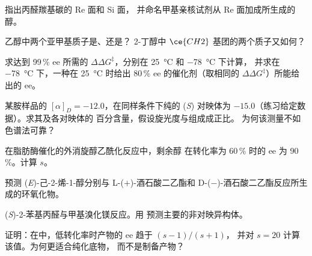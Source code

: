 \begin{exercise}[$\star$]\label{exo:b3:asymmetric-synthesis:3}
指出丙醛羰基碳的 Re 面和 Si 面，
并命名甲基亲核试剂从 Re 面加成所生成的醇。
\end{exercise}

\begin{exercise}[$\star$]\label{exo:b3:asymmetric-synthesis:4}
乙醇中两个亚甲基质子是、还是？
2-丁醇中 $\ce{CH2}$ 基团的两个质子又如何？
\end{exercise}

\begin{exercise}[$\star\star$]\label{exo:b3:asymmetric-synthesis:5}
求达到 99\,\% ee 所需的 $\Delta\Delta G^\ddagger$，分别在 \qty{25}{\celsius} 和 \qty{-78}{\celsius} 下计算，
并求在 \qty{-78}{\celsius} 下，一种在 \qty{25}{\celsius} 时给出 80\,\% ee 的催化剂（取相同的 $\Delta\Delta G^\ddagger$）所能给出的 ee。
\end{exercise}

\begin{exercise}[$\star\star$]\label{exo:b3:asymmetric-synthesis:6}
某胺样品的 $[\alpha]_D = -12.0$，在同样条件下纯的 (\textit{S})
对映体为 $-15.0$（练习给定数据）。求其及各对映体的
百分含量，假设旋光度与组成成正比。
为何该测量不如色谱法可靠？
\end{exercise}

\begin{exercise}[$\star\star$]\label{exo:b3:asymmetric-synthesis:7}
在脂肪酶催化的外消旋醇乙酰化反应中，剩余醇
在转化率为 60\,\% 时的 ee 为 90\,\%。计算 $s$。
\end{exercise}

\begin{exercise}[$\star\star$]\label{exo:b3:asymmetric-synthesis:8}
预测 (\textit{E})-己-2-烯-1-醇分别与 L-($+$)-酒石酸二乙酯和
D-($-$)-酒石酸二乙酯反应所生成的环氧化物。
\end{exercise}

\begin{exercise}[$\star\star$]\label{exo:b3:asymmetric-synthesis:9}
(\textit{S})-2-苯基丙醛与甲基溴化镁反应。用
预测主要的非对映异构体。
\end{exercise}

\begin{exercise}[$\star\star\star$]\label{exo:b3:asymmetric-synthesis:10}
证明：在中，低转化率时产物的 ee 趋于 $(s - 1)/(s + 1)$，
并对 $s = 20$ 计算该值。为何更适合纯化底物，
而不是制备产物？
\end{exercise}

